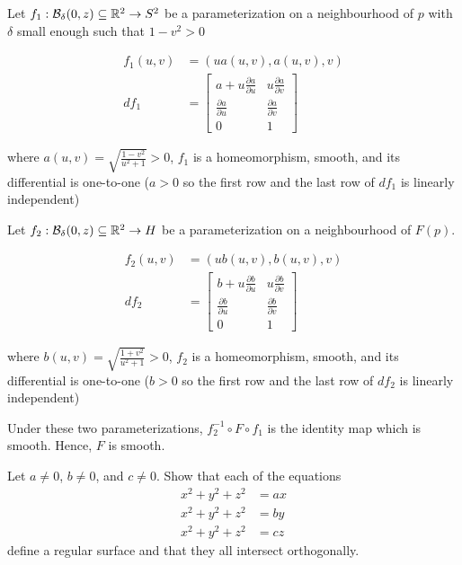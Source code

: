 \documentclass{article}
\begin{document}
Let $f_1: \mathcal{B}_{\delta} {(0, z)} \subseteq \mathbb{R}^2 \to S^2$ be a parameterization on a neighbourhood of $p$ with $\delta$ small enough such that $1 - v^2 > 0$

\begin{align*}
    f_1(u, v) &= \left( u a(u, v), a(u, v), v \right) \\
    df_1 &= \begin{bmatrix}
    a + u \frac{\partial a}{\partial u} &  u \frac{\partial a}{\partial v}\\
    \frac{\partial a}{\partial u} & \frac{\partial a}{\partial v} \\
    0 & 1
    \end{bmatrix}
\end{align*}

where $a(u, v) = \sqrt{\frac{1-v^2}{u^2+1}} > 0$, $f_1$ is a homeomorphism, smooth, and its differential is one-to-one ($a > 0$ so the first row and the last row of $df_1$ is linearly independent)

Let $f_2: \mathcal{B}_{\delta} {(0, z)} \subseteq \mathbb{R}^2 \to H$ be a parameterization on a neighbourhood of $F(p)$.

\begin{align*}
    f_2(u, v) &= \left( u b(u, v), b(u, v), v \right) \\
    df_2 &= \begin{bmatrix}
    b + u \frac{\partial b}{\partial u} &  u \frac{\partial b}{\partial v}\\
    \frac{\partial b}{\partial u} & \frac{\partial b}{\partial v} \\
    0 & 1
    \end{bmatrix}
\end{align*}

where $b(u, v) = \sqrt{\frac{1+v^2}{u^2+1}} > 0$, $f_2$ is a homeomorphism, smooth, and its differential is one-to-one ($b > 0$ so the first row and the last row of $df_2$ is linearly independent)

Under these two parameterizations, $f_2^{-1} \circ F \circ f_1$ is the identity map which is smooth. Hence, $F$ is smooth.

\begin{problem}
    Let $a \neq 0$, $b \neq 0$, and $c \neq 0$. Show that each of the equations
    \begin{align*}
        x^2 + y^2 + z^2 &= ax \\
        x^2 + y^2 + z^2 &= by \\
        x^2 + y^2 + z^2 &= cz
    \end{align*}
    define a regular surface and that they all intersect orthogonally.
\end{problem}
\end{document}
